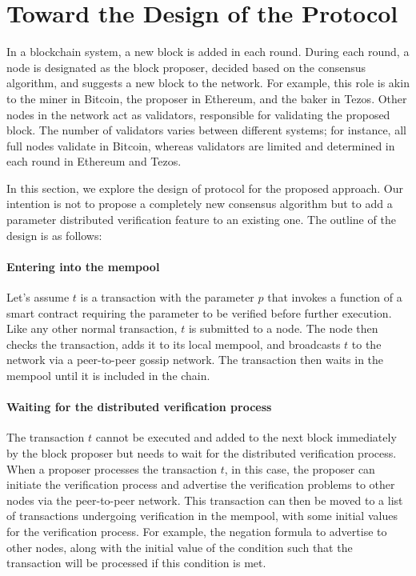 \documentclass[runningheads]{llncs}
\begin{document}
\section{Toward the Design of the Protocol}
\label{sec:design}
In a blockchain system, a new block is added in each round. During each round, a node is designated as the block proposer, decided based on the consensus algorithm, and suggests a new block to the network. For example, this role is akin to the miner in Bitcoin, the proposer in Ethereum, and the baker in Tezos. Other nodes in the network act as validators, responsible for validating the proposed block. The number of validators varies between different systems; for instance, all full nodes validate in Bitcoin, whereas validators are limited and determined in each round in Ethereum and Tezos.

In this section, we explore the design of protocol for the proposed approach. Our intention is not to propose a completely new consensus algorithm but to add a parameter distributed verification feature to an existing one. The outline of the design is as follows:
\paragraph{Entering into the mempool} Let's assume $t$ is a transaction with the parameter $p$ that invokes a function of a smart contract requiring the parameter to be verified before further execution. Like any other normal transaction, $t$ is submitted to a node. The node then checks the transaction, adds it to its local mempool, and broadcasts $t$ to the network via a peer-to-peer gossip network. The transaction then waits in the mempool until it is included in the chain.
\paragraph{Waiting for the distributed verification process} The transaction $t$ cannot be executed and added to the next block immediately by the block proposer but needs to wait for the distributed verification process. When a proposer processes the transaction $t$, in this case, the proposer can initiate the verification process and advertise the verification problems to other nodes via the peer-to-peer network. This transaction can then be moved to a list of transactions undergoing verification in the mempool, with some initial values for the verification process. For example, the negation formula to advertise to other nodes, along with the initial value of the condition such that the transaction will be processed if this condition is met.
\end{document}
